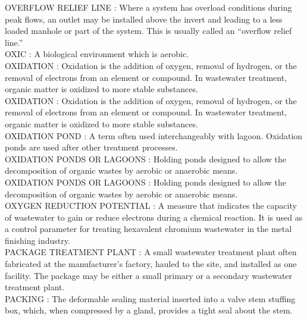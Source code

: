 \vspace{0.15cm}
OVERFLOW RELIEF LINE :  Where a system has overload conditions during peak flows, an outlet may be installed above the invert and leading to a less loaded manhole or part of the system. This is usually called an “overflow relief line.” \\
\vspace{0.15cm}
OXIC :   A biological environment which is aerobic.\\
\vspace{0.15cm}
OXIDATION :  Oxidation is the addition of oxygen, removal of hydrogen, or the removal of electrons from an element or compound. In wastewater treatment, organic matter is oxidized to more stable substances.\\
\vspace{0.15cm}
OXIDATION :  Oxidation is the addition of oxygen, removal of hydrogen, or the removal of electrons from an element or compound. In wastewater treatment, organic matter is oxidized to more stable substances.\\
\vspace{0.15cm}
OXIDATION POND :  A term often used interchangeably with lagoon. Oxidation ponds are used after other treatment processes.\\
\vspace{0.15cm}
OXIDATION PONDS OR LAGOONS :   Holding ponds designed to allow the decomposition of organic wastes by aerobic or anaerobic means.\\
\vspace{0.15cm}
OXIDATION PONDS OR LAGOONS :   Holding ponds designed to allow the decomposition of organic wastes by aerobic or anaerobic means.\\
\vspace{0.15cm}
OXYGEN REDUCTION POTENTIAL :   A measure that indicates the capacity of wastewater to gain or reduce electrons during a chemical reaction. It is used as a control parameter for treating hexavalent chromium wastewater in the metal finishing industry.\\
\vspace{0.15cm}
PACKAGE TREATMENT PLANT :  A small wastewater treatment plant often fabricated at the manufacturer’s factory, hauled to the site, and installed as one facility. The package may be either a small primary or a secondary wastewater treatment plant.\\
\vspace{0.15cm}
PACKING :   The deformable sealing material inserted into a valve stem stuffing box, which, when compressed by a gland, provides a tight seal about the stem.\\
